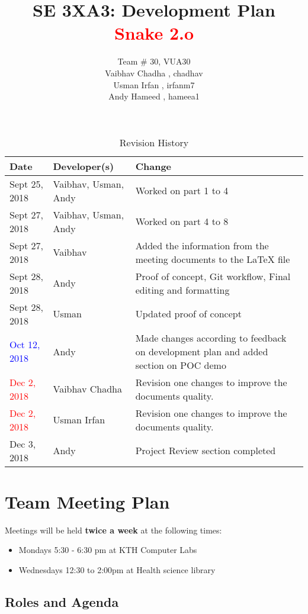 \documentclass{article}
\title{SE 3XA3: Development Plan\\\textcolor{red}{Snake 2.o}}
\author{Team \# 30, VUA30
		\\ Vaibhav Chadha , chadhav
		\\ Usman Irfan , irfanm7
		\\ Andy Hameed , hameea1
}
\date{}
\begin{document}
\begin{table}[hp]
\caption{Revision History} \label{TblRevisionHistory}
\begin{tabularx}{\textwidth}{llX}
\toprule
\textbf{Date} & \textbf{Developer(s)} & \textbf{Change}\\
\midrule
Sept 25, 2018 & Vaibhav, Usman, Andy & Worked on part 1 to 4\\
Sept 27, 2018 & Vaibhav, Usman, Andy & Worked on part 4 to 8\\
Sept 27, 2018 & Vaibhav & Added the information from the meeting documents to the LaTeX file\\
Sept 28, 2018 & Andy & Proof of concept, Git workflow, Final editing and formatting\\
Sept 28, 2018 & Usman & Updated proof of concept\\
\textcolor{blue}{Oct 12, 2018} & Andy & Made changes according to feedback on development plan and added section on POC demo\\
\textcolor{red}{Dec 2, 2018} & Vaibhav Chadha & Revision one changes to improve the documents quality.\\
\textcolor{red}{Dec 2, 2018} & Usman Irfan & Revision one changes to improve the documents quality.\\
Dec 3, 2018 & Andy & Project Review section completed\\
\bottomrule
\end{tabularx}
\end{table}

\newpage

\maketitle


\section{Team Meeting Plan}
Meetings will be held \textbf{twice a week} at the following times:
\begin{itemize}
\item Mondays 5:30 - 6:30 pm at KTH Computer Labs
\item  Wednesdays 12:30 to 2:00pm at Health science library
\end{itemize}

\subsection{Roles and Agenda}
\end{document}
